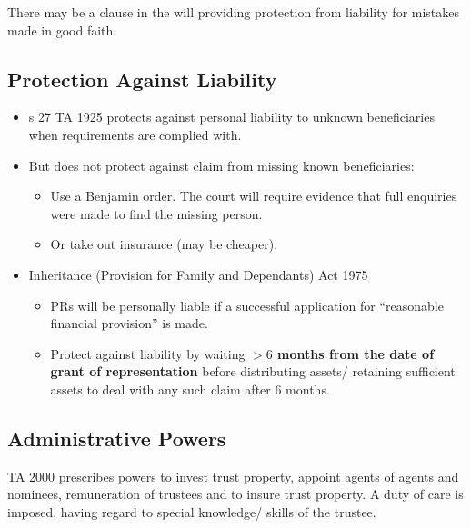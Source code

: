 \documentclass[
]{article}
\providecommand{\tightlist}{%
  \setlength{\itemsep}{0pt}\setlength{\parskip}{0pt}}
\begin{document}
There may be a clause in the will providing protection from liability
for mistakes made in good faith.

\hypertarget{protection-against-liability}{%
\subsection{Protection Against
Liability}\label{protection-against-liability}}

\begin{itemize}
\tightlist
\item
  s 27 TA 1925 protects against personal liability to unknown
  beneficiaries when requirements are complied with.
\item
  But does not protect against claim from missing known beneficiaries:

  \begin{itemize}
  \tightlist
  \item
    Use a Benjamin order. The court will require evidence that full
    enquiries were made to find the missing person.
  \item
    Or take out insurance (may be cheaper).
  \end{itemize}
\item
  Inheritance (Provision for Family and Dependants) Act 1975

  \begin{itemize}
  \tightlist
  \item
    PRs will be personally liable if a successful application for
    ``reasonable financial provision'' is made.
  \item
    Protect against liability by waiting \textbf{\(>6\) months from the
    date of grant of representation} before distributing assets/
    retaining sufficient assets to deal with any such claim after 6
    months.
  \end{itemize}
\end{itemize}

\hypertarget{administrative-powers}{%
\subsection{Administrative Powers}\label{administrative-powers}}

TA 2000 prescribes powers to invest trust property, appoint agents of
agents and nominees, remuneration of trustees and to insure trust
property. A duty of care is imposed, having regard to special knowledge/
skills of the trustee.
\end{document}
